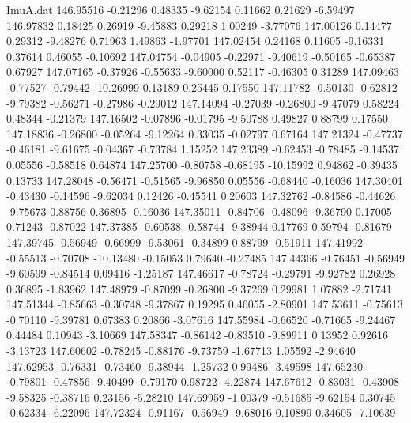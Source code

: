 \begin{filecontents}{ImuA.dat}
 146.95516   -0.21296    0.48335   -9.62154    0.11662    0.21629   -6.59497
 146.97832    0.18425    0.26919   -9.45883    0.29218    1.00249   -3.77076
 147.00126    0.14477    0.29312   -9.48276    0.71963    1.49863   -1.97701
 147.02454    0.24168    0.11605   -9.16331    0.37614    0.46055   -0.10692
 147.04754   -0.04905   -0.22971   -9.40619   -0.50165   -0.65387    0.67927
 147.07165   -0.37926   -0.55633   -9.60000    0.52117   -0.46305    0.31289
 147.09463   -0.77527   -0.79442  -10.26999    0.13189    0.25445    0.17550
 147.11782   -0.50130   -0.62812   -9.79382   -0.56271   -0.27986   -0.29012
 147.14094   -0.27039   -0.26800   -9.47079    0.58224    0.48344   -0.21379
 147.16502   -0.07896   -0.01795   -9.50788    0.49827    0.88799    0.17550
 147.18836   -0.26800   -0.05264   -9.12264    0.33035   -0.02797    0.67164
 147.21324   -0.47737   -0.46181   -9.61675   -0.04367   -0.73784    1.15252
 147.23389   -0.62453   -0.78485   -9.14537    0.05556   -0.58518    0.64874
 147.25700   -0.80758   -0.68195  -10.15992    0.94862   -0.39435    0.13733
 147.28048   -0.56471   -0.51565   -9.96850    0.05556   -0.68440   -0.16036
 147.30401   -0.43430   -0.14596   -9.62034    0.12426   -0.45541    0.20603
 147.32762   -0.84586   -0.44626   -9.75673    0.88756    0.36895   -0.16036
 147.35011   -0.84706   -0.48096   -9.36790    0.17005    0.71243   -0.87022
 147.37385   -0.60538   -0.58744   -9.38944    0.17769    0.59794   -0.81679
 147.39745   -0.56949   -0.66999   -9.53061   -0.34899    0.88799   -0.51911
 147.41992   -0.55513   -0.70708  -10.13480   -0.15053    0.79640   -0.27485
 147.44366   -0.76451   -0.56949   -9.60599   -0.84514    0.09416   -1.25187
 147.46617   -0.78724   -0.29791   -9.92782    0.26928    0.36895   -1.83962
 147.48979   -0.87099   -0.26800   -9.37269    0.29981    1.07882   -2.71741
 147.51344   -0.85663   -0.30748   -9.37867    0.19295    0.46055   -2.80901
 147.53611   -0.75613   -0.70110   -9.39781    0.67383    0.20866   -3.07616
 147.55984   -0.66520   -0.71665   -9.24467    0.44484    0.10943   -3.10669
 147.58347   -0.86142   -0.83510   -9.89911    0.13952    0.92616   -3.13723
 147.60602   -0.78245   -0.88176   -9.73759   -1.67713    1.05592   -2.94640
 147.62953   -0.76331   -0.73460   -9.38944   -1.25732    0.99486   -3.49598
 147.65230   -0.79801   -0.47856   -9.40499   -0.79170    0.98722   -4.22874
 147.67612   -0.83031   -0.43908   -9.58325   -0.38716    0.23156   -5.28210
 147.69959   -1.00379   -0.51685   -9.62154    0.30745   -0.62334   -6.22096
 147.72324   -0.91167   -0.56949   -9.68016    0.10899    0.34605   -7.10639

\end{filecontents}
